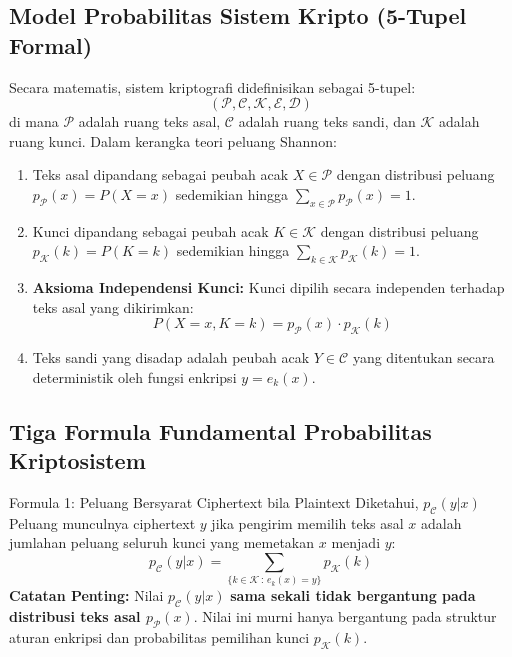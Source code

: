 \documentclass[11pt,a4paper]{article}
\begin{document}
\subsection{Model Probabilitas Sistem Kripto (5-Tupel Formal)}
Secara matematis, sistem kriptografi didefinisikan sebagai 5-tupel:
\[
(\mathcal{P}, \mathcal{C}, \mathcal{K}, \mathcal{E}, \mathcal{D})
\]
di mana $\mathcal{P}$ adalah ruang teks asal, $\mathcal{C}$ adalah ruang teks sandi, dan $\mathcal{K}$ adalah ruang kunci. Dalam kerangka teori peluang Shannon:
\begin{enumerate}[leftmargin=*]
    \item Teks asal dipandang sebagai peubah acak $X \in \mathcal{P}$ dengan distribusi peluang $p_{\mathcal{P}}(x) = P(X = x)$ sedemikian hingga $\sum_{x \in \mathcal{P}} p_{\mathcal{P}}(x) = 1$.
    \item Kunci dipandang sebagai peubah acak $K \in \mathcal{K}$ dengan distribusi peluang $p_{\mathcal{K}}(k) = P(K = k)$ sedemikian hingga $\sum_{k \in \mathcal{K}} p_{\mathcal{K}}(k) = 1$.
    \item \textbf{Aksioma Independensi Kunci:} Kunci dipilih secara independen terhadap teks asal yang dikirimkan:
    \[
    P(X = x, K = k) = p_{\mathcal{P}}(x) \cdot p_{\mathcal{K}}(k)
    \]
    \item Teks sandi yang disadap adalah peubah acak $Y \in \mathcal{C}$ yang ditentukan secara deterministik oleh fungsi enkripsi $y = e_k(x)$.
\end{enumerate}

\subsection{Tiga Formula Fundamental Probabilitas Kriptosistem}

\begin{tipsbox}{Formula 1: Peluang Bersyarat Ciphertext bila Plaintext Diketahui, $p_{\mathcal{C}}(y|x)$}
Peluang munculnya ciphertext $y$ jika pengirim memilih teks asal $x$ adalah jumlahan peluang seluruh kunci yang memetakan $x$ menjadi $y$:
\begin{equation}
\label{eq:pyx}
p_{\mathcal{C}}(y|x) = \sum_{\{k \in \mathcal{K} \,:\, e_k(x) = y\}} p_{\mathcal{K}}(k)
\end{equation}
\textbf{Catatan Penting:} Nilai $p_{\mathcal{C}}(y|x)$ \textbf{sama sekali tidak bergantung pada distribusi teks asal $p_{\mathcal{P}}(x)$}. Nilai ini murni hanya bergantung pada struktur aturan enkripsi dan probabilitas pemilihan kunci $p_{\mathcal{K}}(k)$.
\end{tipsbox}
\end{document}
